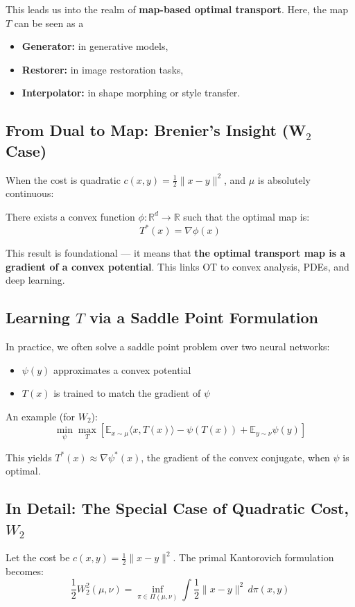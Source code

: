 \documentclass[11pt]{article}
\begin{document}
This leads us into the realm of \textbf{map-based optimal transport}. Here, the map $T$ can be seen as a 

\begin{itemize}
  \item \textbf{Generator:} in generative models,
  \item \textbf{Restorer:} in image restoration tasks,
  \item \textbf{Interpolator:} in shape morphing or style transfer.
\end{itemize}

\subsection*{From Dual to Map: Brenier's Insight (W$_2$ Case)}
When the cost is quadratic $c(x,y) = \frac{1}{2}\|x - y\|^2$, and $\mu$ is absolutely continuous:

\begin{tcolorbox}[colback=blue!5!white, colframe=blue!75!black, title=Brenier's Theorem (1991)]
There exists a convex function $\phi : \mathbb{R}^d \to \mathbb{R}$ such that the optimal map is:
\[
T^*(x) = \nabla \phi(x)
\]
\end{tcolorbox}

This result is foundational — it means that \textbf{the optimal transport map is a gradient of a convex potential}. This links OT to convex analysis, PDEs, and deep learning.

\subsection*{Learning $T$ via a Saddle Point Formulation}
In practice, we often solve a saddle point problem over two neural networks:
\begin{itemize}
  \item $\psi(y)$ approximates a convex potential
  \item $T(x)$ is trained to match the gradient of $\psi$
\end{itemize}

An example (for $W_2$):
\[
\min_{\psi} \max_{T} \left[ \mathbb{E}_{x \sim \mu} \langle x, T(x) \rangle - \psi(T(x)) + \mathbb{E}_{y \sim \nu} \psi(y) \right]
\]

This yields $T^*(x) \approx \nabla \psi^*(x)$, the gradient of the convex conjugate, when $\psi$ is optimal.

\subsection*{In Detail: The Special Case of Quadratic Cost, $W_2$}
Let the cost be $c(x,y) = \frac{1}{2}\|x - y\|^2$. The primal Kantorovich formulation becomes:
\[
\frac{1}{2} W_2^2(\mu, \nu) = \inf_{\pi \in \Pi(\mu, \nu)} \int \frac{1}{2}\|x - y\|^2 \, d\pi(x,y)
\]
\end{document}
